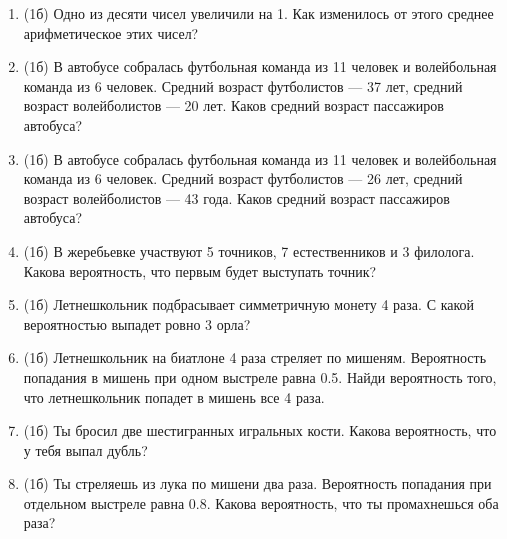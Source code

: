 \documentclass[a4paper, 12pt]{article}
\begin{document}
\begin{enumerate}
\item (1б) Одно из десяти чисел увеличили на 1. Как изменилось от этого среднее арифметическое этих чисел?
\item (1б) В автобусе собралась футбольная команда из 11 человек и волейбольная команда из 6 человек. Средний возраст футболистов — 37 лет, средний возраст волейболистов — 20 лет. Каков средний возраст пассажиров автобуса?
\item (1б) В автобусе собралась футбольная команда из 11 человек и волейбольная команда из 6 человек. Средний возраст футболистов — 26 лет, средний возраст волейболистов — 43 года. Каков средний возраст пассажиров автобуса?
\item (1б) В жеребьевке участвуют 5 точников, 7 естественников и 3 филолога.
Какова вероятность, что первым будет выступать точник?
\item (1б) Летнешкольник подбрасывает симметричную монету 4 раза.
С какой вероятностью выпадет ровно 3 орла?
\item (1б) Летнешкольник на биатлоне 4 раза стреляет по мишеням.
Вероятность попадания в мишень при одном выстреле равна 0.5.
Найди вероятность того, что летнешкольник попадет в мишень все 4 раза.
\item (1б) Ты бросил две шестигранных игральных кости. Какова вероятность, что у тебя выпал дубль?
\item (1б) Ты стреляешь из лука по мишени два раза. Вероятность попадания при отдельном выстреле равна 0.8.
Какова вероятность, что ты промахнешься оба раза?
\end{enumerate}
\end{document}
